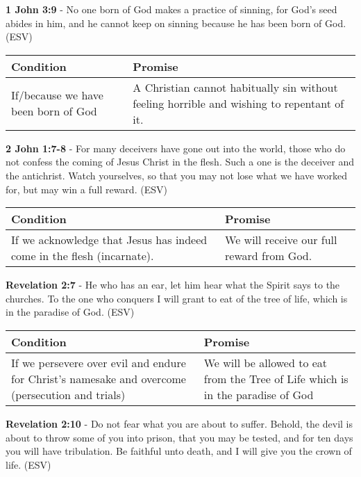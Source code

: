 \documentclass[11pt]{article}
\begin{document}
\textbf{1 John 3:9} -  No one born of God makes a practice of sinning, for God's seed abides in him, and he cannot keep on sinning because he has been born of God.  (ESV)

\begin{center}
\begin{tabular}{ll}
Condition & Promise\\[0pt]
\hline
If/because we have been born of God & A Christian cannot habitually sin without feeling horrible and wishing to repentant of it.\\[0pt]
\end{tabular}
\end{center}

\textbf{2 John 1:7-8} -  For many deceivers have gone out into the world, those who do not confess the coming of Jesus Christ in the flesh.  Such a one is the deceiver and the antichrist.  Watch yourselves, so that you may not lose what we have worked for, but may win a full reward.  (ESV)

\begin{center}
\begin{tabular}{ll}
Condition & Promise\\[0pt]
\hline
If we acknowledge that Jesus has indeed come in the flesh (incarnate). & We will receive our full reward from God.\\[0pt]
\end{tabular}
\end{center}

\textbf{Revelation 2:7} -  He who has an ear, let him hear what the Spirit says to the churches.  To the one who conquers I will grant to eat of the tree of life, which is in the paradise of God.  (ESV)

\begin{center}
\begin{tabular}{ll}
Condition & Promise\\[0pt]
\hline
If we persevere over evil and endure for Christ's namesake and overcome (persecution and trials) & We will be allowed to eat from the Tree of Life which is in the paradise of God\\[0pt]
\end{tabular}
\end{center}

\textbf{Revelation 2:10} -  Do not fear what you are about to suffer.  Behold, the devil is about to throw some of you into prison, that you may be tested, and for ten days you will have tribulation.  Be faithful unto death, and I will give you the crown of life.  (ESV)
\end{document}
